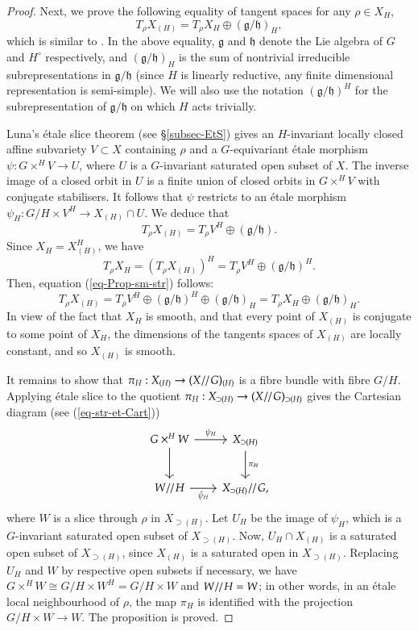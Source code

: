 \documentclass[11pt,oneside,dvipsnames]{amsart}
\theoremstyle{plain}
\theoremstyle{definition}
\theoremstyle{named}
\DeclareMathOperator{\ds}{\!/\mkern-2mu/\mkern-2mu}
\begin{document}
\begin{proof}
Next, we prove the following equality of tangent spaces for any $\rho\in X_H$,
\begin{equation}\label{eq-Prop-sm-str}
T_{\rho}X_{(H)}=T_{\rho}X_H\oplus(\mathfrak{g}/\mathfrak{h})_H,
\end{equation}
which is similar to \cite[Lemma 3.10]{BS0}. In the above equality, $\mathfrak{g}$ and $\mathfrak{h}$ denote the Lie algebra of $G$ and $H^{\circ}$ respectively, and $(\mathfrak{g}/\mathfrak{h})_H$ is the sum of nontrivial irreducible subrepresentations in $\mathfrak{g}/\mathfrak{h}$ (since $H$ is linearly reductive, any finite dimensional representation is semi-simple). We will also use the notation $(\mathfrak{g}/\mathfrak{h})^H$ for the subrepresentation of $\mathfrak{g}/\mathfrak{h}$ on which $H$ acts trivially.

Luna's \'etale slice theorem (see \S \ref{subsec-EtS}) gives an $H$-invariant locally closed affine subvariety $V\subset X$ containing $\rho$ and a $G$-equivariant \'etale morphism $\psi:G\times^HV\rightarrow U$, where $U$ is a $G$-invariant saturated open subset of $X$. The inverse image of a closed orbit in $U$ is a finite union of closed orbits in $G\times^HV$ with conjugate stabilisers. It follows that $\psi$ restricts to an \'etale morphism $\psi_H:G/H\times V^H\rightarrow X_{(H)}\cap U$. We deduce that
$$
T_{\rho}X_{(H)}=T_{\rho}V^H\oplus(\mathfrak{g}/\mathfrak{h}).
$$
Since $X_H=X_{(H)}^H$, we have
$$
T_{\rho}X_H=(T_{\rho}X_{(H)})^H=T_{\rho}V^H\oplus(\mathfrak{g}/\mathfrak{h})^H.
$$
Then, equation (\ref{eq-Prop-sm-str}) follows:
$$
T_{\rho}X_{(H)}=T_{\rho}V^H\oplus(\mathfrak{g}/\mathfrak{h})^H\oplus(\mathfrak{g}/\mathfrak{h})_H=T_{\rho}X_H\oplus(\mathfrak{g}/\mathfrak{h})_H.
$$
In view of the fact that $X_H$ is smooth, and that every point of $X_{(H)}$ is conjugate to some point of $X_H$, the dimensions of the tangents spaces of $X_{(H)}$ are locally constant, and so $X_{(H)}$ is smooth.

It remains to show that $\pi_H:X_{(H)}\rightarrow(X\ds G)_{(H)}$ is a fibre bundle with fibre $G/H$. Applying \'etale slice to the quotient $\pi_H:X_{\supset(H)}\rightarrow(X\ds G)_{\supset(H)}$ gives the Cartesian diagram (see (\ref{eq-str-et-Cart}))
$$
\begin{tikzcd}[row sep=2.5em, column sep=2em]
G\times^HW \arrow[r, "\psi_H"] \arrow[d, swap] & X_{\supset(H)} \arrow[d, "\pi_H"]\\
W\ds H \arrow[r, "\bar{\psi}_H"'] & X_{\supset (H)}\ds G,
\end{tikzcd}
$$
where $W$ is a slice through $\rho$ in $X_{\supset(H)}$. Let $U_H$ be the image of $\psi_H$, which is a $G$-invariant saturated open subset of $X_{\supset (H)}$. Now, $U_H\cap X_{(H)}$ is a saturated open subset of $X_{\supset(H)}$, since $X_{(H)}$ is a saturated open in $X_{\supset(H)}$. Replacing $U_H$ and $W$ by respective open subsets if necessary, we have $G\times^HW\cong G/H\times W^H=G/H\times W$ and $W\ds H=W$; in other words, in an \'etale local neighbourhood of $\rho$, the map $\pi_H$ is identified with the projection $G/H\times W\rightarrow W$. The proposition is proved.
\end{proof}
\end{document}
